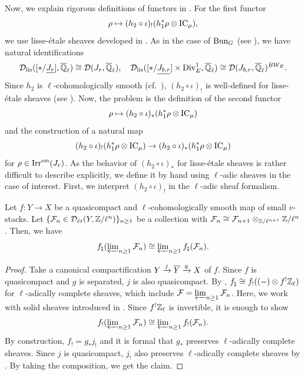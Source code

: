 \documentclass[12pt,reqno]{amsart}
\begin{document}
Now, we explain rigorous definitions of functors in . For the first functor 
\[
    \rho \mapsto (h_2 \circ \iota)_! (h_1^*\rho \otimes {\operatorname{IC}}_\mu), 
\]
we use lisse-\'{e}tale sheaves developed in \cite[{}VII.6]{FS24}. As in the case of ${\operatorname{Bun}}_G$ (see \cite[{}VII.7.1, IX.2.3]{FS24}), we have natural identifications
\[
    {\mathcal{D}}_{\operatorname{lis}}([\ast / {\underline{J_r}}], {\overline{\mathbb{Q}}_\ell}) \cong {\mathcal{D}}(J_r, {\overline{\mathbb{Q}}_\ell}), \quad 
    {\mathcal{D}}_{\operatorname{lis}}([\ast / {\underline{J_{b, r}}}] \times {\operatorname{Div}}^1_E, {\overline{\mathbb{Q}}_\ell}) \cong {\mathcal{D}}(J_{b, r}, {\overline{\mathbb{Q}}_\ell})^{BW_E}. 
\]
Since $h_2$ is $\ell$-cohomologically smooth (cf.\ ), $(h_2 \circ \iota)_!$ is well-defined for lisse-\'{e}tale sheaves (see \cite[p.161]{HI25}). Now, the problem is the definition of the second functor 
\[
    \rho \mapsto (h_2 \circ \iota)_* (h_1^*\rho \otimes {\operatorname{IC}}_\mu)
\]
and the construction of a natural map 
\[
    (h_2 \circ \iota)_! (h_1^*\rho \otimes {\operatorname{IC}}_\mu) \to (h_2 \circ \iota)_* (h_1^*\rho \otimes {\operatorname{IC}}_\mu)
\]
for $\rho \in {\operatorname{Irr}}^{\operatorname{sm}}(J_r)$. As the behavior of $(h_2 \circ \iota)_*$ for lisse-\'{e}tale sheaves is rather difficult to describe explicitly, we define it by hand using $\ell$-adic sheaves in the case of interest. First, we interpret $(h_2 \circ \iota)_!$ in the $\ell$-adic sheaf formalism. 

\begin{lem} \label{lem:qc_smooth_preserve_ell_adic}
    Let $f \colon Y \to X$ be a quasicompact and $\ell$-cohomologically smooth map of small $v$-stacks. Let $\{ {\mathcal{F}}_n \in {\mathcal{D}}_{\acute{e}t}(Y, \mathbb{Z} / \ell^n) \}_{n \geq 1}$ be a collection with ${\mathcal{F}}_{n} \cong {\mathcal{F}}_{n + 1} \otimes_{\mathbb{Z}/\ell^{n+1}} \mathbb{Z}/\ell^n$. Then, we have 
    \[
        f_\natural( \varprojlim\nolimits_{n \geq 1} {\mathcal{F}}_n) \cong \varprojlim\nolimits_{n \geq 1} f_\natural({\mathcal{F}}_n). 
    \]
\end{lem}
\begin{proof}
    Take a canonical compactification $Y \xrightarrow{j} {\overline{Y}} \xrightarrow{g} X$ of $f$. Since $f$ is quasicompact and $g$ is separated, $j$ is also quasicompact. By \cite[Proposition 8.10]{Man26_l_adic}, $f_\natural \cong f_!((-) \otimes f^! \mathbb{Z}_\ell)$ for $\ell$-adically complete sheaves, which include ${\mathcal{F}} = \varprojlim_{n \geq 1} {\mathcal{F}}_n$. Here, we work with solid sheaves introduced in \cite[{}VII.1]{FS24}. Since $f^! \mathbb{Z}_\ell$ is invertible, it is enough to show 
    \[
        f_!( \varprojlim\nolimits_{n \geq 1} {\mathcal{F}}_n) \cong \varprojlim\nolimits_{n \geq 1} f_!({\mathcal{F}}_n). 
    \]
    By construction, $f_! = g_* j_!$ and it is formal that $g_*$ preserves $\ell$-adically complete sheaves. Since $j$ is quasicompact, $j_!$ also preserves $\ell$-adically complete sheaves by \cite[Lemma 5.2 (iv)]{Man26_l_adic}. By taking the composition, we get the claim. 
\end{proof}
\end{document}
